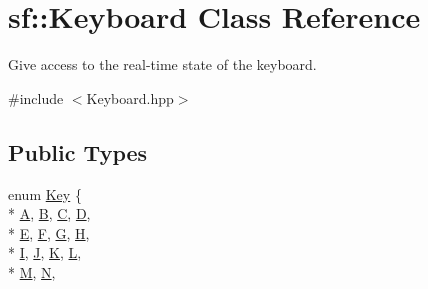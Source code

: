 \hypertarget{classsf_1_1_keyboard}{\section{sf\-:\-:Keyboard Class Reference}
\label{classsf_1_1_keyboard}
}


Give access to the real-\/time state of the keyboard.  




{\ttfamily \#include $<$Keyboard.\-hpp$>$}

\subsection*{Public Types}
\begin{DoxyCompactItemize}
\item 
enum \hyperlink{classsf_1_1_keyboard_acb4cacd7cc5802dec45724cf3314a142}{Key} \{ \\*
\hyperlink{classsf_1_1_keyboard_acb4cacd7cc5802dec45724cf3314a142a9d06fa7ac9af597034ea724fb08b991e}{A}, 
\hyperlink{classsf_1_1_keyboard_acb4cacd7cc5802dec45724cf3314a142aca3142235e5c4199f0b8b45d8368ef94}{B}, 
\hyperlink{classsf_1_1_keyboard_acb4cacd7cc5802dec45724cf3314a142a0d586c4ec0cd6b537cb6f49180fedecc}{C}, 
\hyperlink{classsf_1_1_keyboard_acb4cacd7cc5802dec45724cf3314a142ae778600bd3e878b59df1dbdd5877ba7a}{D}, 
\\*
\hyperlink{classsf_1_1_keyboard_acb4cacd7cc5802dec45724cf3314a142a0e027c08438a8bf77e2e1e5d5d75bd84}{E}, 
\hyperlink{classsf_1_1_keyboard_acb4cacd7cc5802dec45724cf3314a142ab8021fbbe5483bc98f124df6f7090002}{F}, 
\hyperlink{classsf_1_1_keyboard_acb4cacd7cc5802dec45724cf3314a142aafb9e3d7679d88d86afc608d79c251f7}{G}, 
\hyperlink{classsf_1_1_keyboard_acb4cacd7cc5802dec45724cf3314a142adfa19328304890e17f4a3f4263eed04d}{H}, 
\\*
\hyperlink{classsf_1_1_keyboard_acb4cacd7cc5802dec45724cf3314a142abaef09665b4d94ebbed50345cab3981e}{I}, 
\hyperlink{classsf_1_1_keyboard_acb4cacd7cc5802dec45724cf3314a142a948c634009beacdab42c3419253a5e85}{J}, 
\hyperlink{classsf_1_1_keyboard_acb4cacd7cc5802dec45724cf3314a142a25beb62393ff666a4bec18ea2a66f3f2}{K}, 
\hyperlink{classsf_1_1_keyboard_acb4cacd7cc5802dec45724cf3314a142a5ef1839ffe19b7e9c24f2ca017614ff9}{L}, 
\\*
\hyperlink{classsf_1_1_keyboard_acb4cacd7cc5802dec45724cf3314a142a9718de9940f723c956587dcb90450a0a}{M}, 
\hyperlink{classsf_1_1_keyboard_acb4cacd7cc5802dec45724cf3314a142ab652ed6b308db95a74dc4ff5229ac9c8}{N}, 

\end{DoxyCompactItemize}
